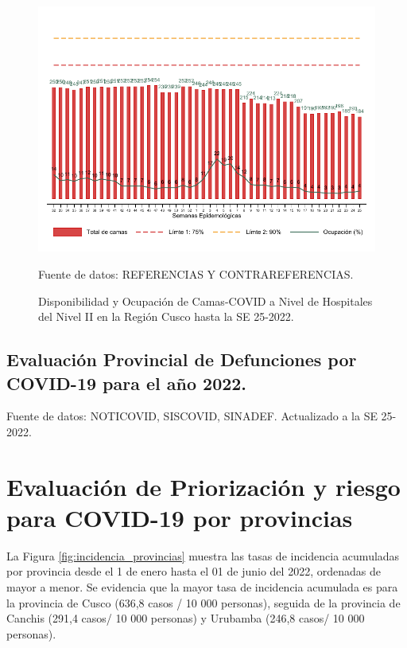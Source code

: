 \documentclass[12pt,a4paper,openany]{book}
\begin{document}
	\begin{figure}[h]
		\caption{Disponibilidad y Ocupación de Camas-COVID a Nivel de Hospitales del Nivel II en la Región Cusco hasta la SE 25-2022.}\label{fig:ocupacion_2nivel}
		\begin{center}
			\includegraphics[width=0.95\linewidth]{../figuras/nivel_2.pdf}
		\end{center}
		{\footnotesize {Fuente de datos: REFERENCIAS Y CONTRAREFERENCIAS.}}
	\end{figure}
	\clearpage
	\begin{landscape}
		
		\subsection*{Evaluación Provincial de Defunciones por COVID-19 para el año 2022.} 
		
		
		
		
		{\footnotesize Fuente de datos: NOTICOVID, SISCOVID, SINADEF. Actualizado a la SE 25-2022.}
		
		\noindent 
		
	\end{landscape}
	
	
	\clearpage
	
	\section*{Evaluación de Priorización y riesgo para COVID-19 por provincias}
	\noindent La Figura \ref{fig:incidencia_provincias} muestra las tasas de incidencia acumuladas por provincia desde el 1 de enero hasta el 01 de junio del 2022, ordenadas de mayor a menor. Se evidencia que la mayor tasa de incidencia acumulada es para la provincia de Cusco (636,8 casos / 10 000 personas), seguida de la provincia de Canchis (291,4 casos/ 10 000 personas) y Urubamba (246,8 casos/ 10 000 personas).
	
\end{document}
